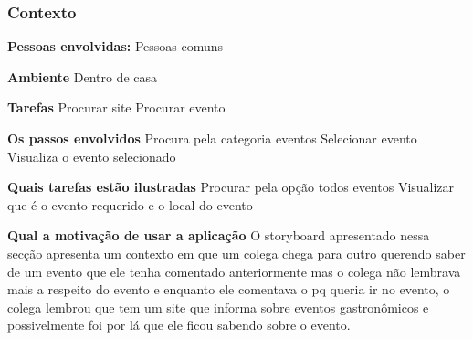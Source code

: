 \subsubsection{Contexto}

\textbf{Pessoas envolvidas:} 
	Pessoas comuns

\textbf{Ambiente}
	Dentro de casa

\textbf{Tarefas}
	Procurar site
	Procurar evento

\textbf{Os passos envolvidos}
	Procura pela categoria eventos
	Selecionar evento
	Visualiza o evento selecionado

\textbf{Quais tarefas estão ilustradas}
	Procurar pela opção todos eventos
	Visualizar que é o evento requerido e o local do evento

\textbf{Qual a motivação de usar a aplicação}
	O storyboard apresentado nessa secção apresenta um contexto em que um colega chega para outro querendo saber de um evento que ele tenha comentado anteriormente mas o colega não lembrava mais a respeito do evento e enquanto ele comentava o pq queria ir no evento, o colega lembrou que tem um site que informa sobre eventos gastronômicos e possivelmente foi por lá que ele ficou sabendo sobre o evento.